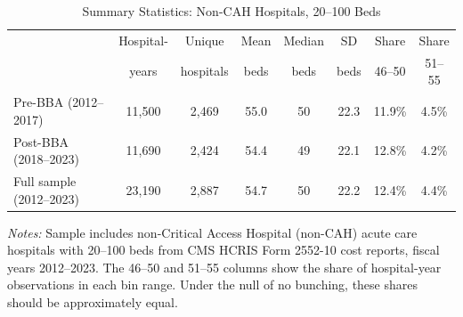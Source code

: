 \begin{table}[t]
\centering
\caption{Summary Statistics: Non-CAH Hospitals, 20--100 Beds}
\label{tab:summary}
\small
\begin{tabular}{lccccccc}
\hline\hline
 & Hospital- & Unique & Mean & Median & SD & Share & Share \\
 & years & hospitals & beds & beds & beds & 46--50 & 51--55 \\
\hline
Pre-BBA (2012--2017) & 11,500 & 2,469 & 55.0 & 50 & 22.3 & 11.9\% & 4.5\% \\
Post-BBA (2018--2023) & 11,690 & 2,424 & 54.4 & 49 & 22.1 & 12.8\% & 4.2\% \\
Full sample (2012--2023) & 23,190 & 2,887 & 54.7 & 50 & 22.2 & 12.4\% & 4.4\% \\
\hline\hline
\end{tabular}
\begin{tablenotes}
\item \textit{Notes:} Sample includes non-Critical Access Hospital (non-CAH) acute care hospitals with 20--100 beds from CMS HCRIS Form 2552-10 cost reports, fiscal years 2012--2023. The 46--50 and 51--55 columns show the share of hospital-year observations in each bin range. Under the null of no bunching, these shares should be approximately equal.
\end{tablenotes}
\end{table}

